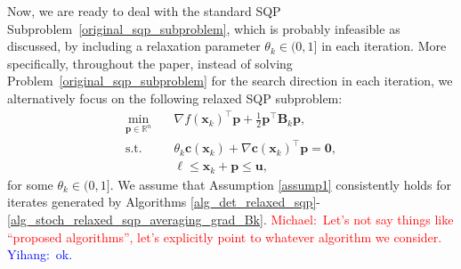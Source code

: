 \documentclass[aos]{imsart}
\numberwithin{equation}{section}
\theoremstyle{plain}
\newcommand{\michael}[1]{\textcolor{red}{Michael:\ #1}}
\newcommand{\yihang}[1]{\textcolor{blue}{Yihang:\ #1}}
\begin{document}
Now, we are ready to deal with the standard SQP Subproblem~\eqref{original_sqp_subproblem}, which is probably infeasible as discussed, by including a relaxation parameter $\theta_k \in (0,1]$ in each iteration.
More specifically, throughout the paper, instead of solving Problem~\eqref{original_sqp_subproblem} for the search direction in each iteration, we alternatively focus on the following relaxed SQP subproblem:
\begin{equation}
\label{relaxed_sqp_subproblem}
    \begin{split}
        \min_{\bm{p} \in \mathbb{R}^{n}} & \hspace{1em} \nabla f(\bm{x}_k)^{\top}\bm{p}+ \frac{1}{2}\bm{p}^{\top}\bm{B}_k\bm{p},\\
        \text{s.t.} & \hspace{1em} \theta_k \bm{c}(\bm{x}_k)+\nabla \bm{c}(\bm{x}_k)^{\top}\bm{p} = \bm{0},\\
        & \hspace{1em} \bm{\ell} \leq \bm{x}_k + \bm{p} \leq \bm{u},
    \end{split}    
\end{equation} 
for some $\theta_k \in (0,1]$.
We assume that Assumption \ref{assump1} consistently holds for iterates generated by  Algorithms \ref{alg_det_relaxed_sqp}-\ref{alg_stoch_relaxed_sqp_averaging_grad_Bk}.
\michael{Let's not say things like ``proposed algorithms'', let's explicitly point to whatever algorithm we consider.}
\yihang{ok.}
\end{document}
